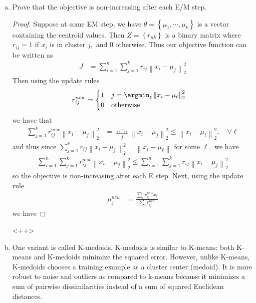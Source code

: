 \documentclass{article}
\begin{document}
\begin{enumerate}[(a)]
	\item Prove that the objective is non-increasing after each E/M step.
		\begin{proof}
			Suppose at some EM step, we have $\theta=\left\{ \mu_1, \cdots, \mu_k \right\}$ is a vector containing the centroid values. Then $Z=\left\{ r_{nk} \right\}$ is a binary matrix where $r_{ij}=1$ if $x_i$ is in cluster $j,$ and 0 otherwise. Thus our objective function can be written as
			\begin{align*}
				J &= \sum_{i=1}^{n} \sum_{j=1}^{k} r_{ij} \left\lVert x_i-\mu_j \right\rVert_2^2
			\end{align*}
			Then using the update rules
			\begin{align*}
				r_{ij}^{new} &= \begin{cases}
					1 & j=\argmin_{\ell} \left\lVert x_i-\mu_\ell \right\rVert_2^2 \\
					0 & \text{otherwise}
				\end{cases}
			\end{align*}
			we have that
			\begin{align*}
				\sum_{j=1}^{k} r_{ij}^{new} \left\lVert x_i-\mu_j \right\rVert_2^2 &= \min_j \left\lVert x_i-\mu_j \right\rVert_2^2 \le \left\lVert x_i-\mu_\ell \right\rVert_2^2, \quad \forall \ell
			\end{align*}
			and thus since $\sum_{j=1}^{k} r_{ij}\left\lVert x_i-\mu_j \right\rVert_2^2 = \left\lVert x_i-\mu_\ell \right\rVert$ for some $\ell,$ we have
			\begin{align*}
				\sum_{i=1}^{n} \sum_{j=1}^{k} r_{ij}^{new}\left\lVert x_i-\mu_j \right\rVert_2^2\le \sum_{i=1}^{n} \sum_{j=1}^{k} r_{ij}\left\lVert x_i-\mu_j \right\rVert_2^2
			\end{align*}
			so the objective is non-increasing after each E step. Next, using the update rule
			\begin{align*}
				\mu_j^{new} &= \frac{\sum_{i}^{}r_{ij}^{new} x_i}{\sum_{i}^{}r_{ij}^{new}}
			\end{align*}
			we have
		\end{proof}<++>

	\item One variant is called K-medoids. K-medoids is similar to K-means: both K-means and K-medoids minimize the squared error. However, unlike K-means, K-medoids chooses a training example as a cluster center (medoid). It is more robust to noise and outliers as compared to k-means because it minimizes a sum of pairwise dissimilarities instead of a sum of squared Euclidean distances. 


\end{enumerate}
\end{document}
